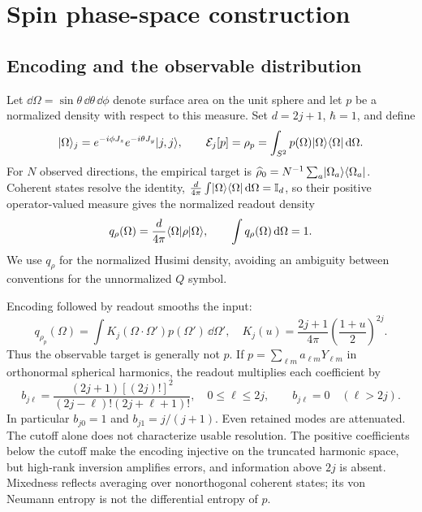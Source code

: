 \section{Spin phase-space construction}
\subsection{Encoding and the observable distribution}
Let $\dd\Omega=\sin\theta\,\dd\theta\,\dd\phi$ denote surface area on the unit sphere and let $p$ be a normalized density with respect to this measure. Set $d=2j+1$, $\hbar=1$, and define
\begin{equation}
 \lvert \Omega\rangle_j=e^{-i\phi J_z}e^{-i\theta J_y}\lvert j,j\rangle,\qquad
 \mathcal{E}_j[p]=\rho_p=\int_{S^2}p(\Omega)\lvert \Omega\rangle\langle \Omega\rvert\,\mathrm{d}\Omega.
 \label{eq:encoding}
\end{equation}
For $N$ observed directions, the empirical target is $\widehat\rho_0=N^{-1}\sum_a\lvert \Omega_a\rangle\langle \Omega_a\rvert$. Coherent states resolve the identity,
$\frac{d}{4\pi}\int\lvert \Omega\rangle\langle \Omega\rvert\,\mathrm{d}\Omega=\mathbb{I}_d$,
so their positive operator-valued measure gives the normalized readout density
\begin{equation}
 q_\rho(\Omega)=\frac{d}{4\pi}\langle \Omega\rvert\rho\lvert \Omega\rangle,\qquad
 \int q_\rho(\Omega)\,\mathrm{d}\Omega=1.
 \label{eq:readout}
\end{equation}
We use $q_\rho$ for the normalized Husimi density, avoiding an ambiguity between conventions for the unnormalized $Q$ symbol.

Encoding followed by readout smooths the input:
\begin{equation}
 q_{\rho_p}(\Omega)=\int K_j(\Omega\cdot\Omega')p(\Omega')\,\dd\Omega',\quad
 K_j(u)=\frac{2j+1}{4\pi}\left(\frac{1+u}{2}\right)^{2j}.
 \label{eq:kernel}
\end{equation}
Thus the observable target is generally not $p$. If $p=\sum_{\ell m}a_{\ell m}Y_{\ell m}$ in orthonormal spherical harmonics, the readout multiplies each coefficient by
\begin{equation}
 b_{j\ell}=\frac{(2j+1)[(2j)!]^2}{(2j-\ell)!(2j+\ell+1)!},\quad 0\leq\ell\leq2j,
 \qquad b_{j\ell}=0\quad(\ell>2j).
 \label{eq:transfer}
\end{equation}
In particular $b_{j0}=1$ and $b_{j1}=j/(j+1)$. Even retained modes are attenuated. The cutoff alone does not characterize usable resolution. The positive coefficients below the cutoff make the encoding injective on the truncated harmonic space, but high-rank inversion amplifies errors, and information above $2j$ is absent. Mixedness reflects averaging over nonorthogonal coherent states; its von Neumann entropy is not the differential entropy of $p$.

